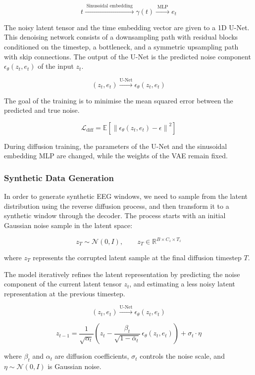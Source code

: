\[
t \xrightarrow{\;\text{Sinusoidal embedding}\;} \gamma(t) \xrightarrow{\;\text{MLP}\;} e_t
\]

The noisy latent tensor and the time embedding vector are given to a 1D U-Net. This denoising network consists of a downsampling path with residual blocks conditioned on the timestep, a bottleneck, and a symmetric upsampling path with skip connections. The output of the U-Net is the predicted noise component $\epsilon_\theta(z_t, e_t)$ of the input $z_t$.

\[
(z_t, e_t) \xrightarrow{\text{U-Net}} \epsilon_\theta(z_t, e_t)
\]

The goal of the training is to minimise the mean squared error between the predicted and true noise.

\[
\mathcal{L}_{\text{diff}} = \mathbb{E} \left[ \left\| \epsilon_\theta(z_t, e_t) - \epsilon \right\|^2 \right]
\]

During diffusion training, the parameters of the U-Net and the sinusoidal embedding MLP are changed, while the weights of the VAE remain fixed.

\subsubsection{Synthetic Data Generation}

In order to generate synthetic EEG windows, we need to sample from the latent distribution using the reverse diffusion process, and then transform it to a synthetic window through the decoder. The process starts with an initial Gaussian noise sample in the latent space: 

\[
z_T \sim \mathcal{N}(0, I), \qquad z_T \in \mathbb{R}^{B \times C_z \times T_z}
\]

where $z_T$ represents the corrupted latent sample at the final diffusion timestep $T$.

The model iteratively refines the latent representation by  predicting the noise component of the current latent tensor $z_t$, and estimating a less noisy latent representation at the previous timestep.

\[
(z_t, e_t) \xrightarrow{\text{U-Net}} \epsilon_\theta(z_t, e_t)
\]

\[
z_{t-1} = \frac{1}{\sqrt{\alpha_t}} \left( z_t - \frac{\beta_t}{\sqrt{1 - \bar{\alpha}_t}} \, \epsilon_\theta(z_t, e_t) \right) + \sigma_t \cdot \eta
\]

where $\beta_t$ and $\alpha_t$ are diffusion coefficients, $\sigma_t$ controls the noise scale, and $\eta \sim \mathcal{N}(0, I)$ is Gaussian noise.

